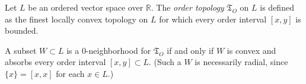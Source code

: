 Let $L$ be an ordered vector space over $\mathbb{R}$. The \textit{order topology} $\mathfrak{T}_O$ on $L$ is defined as the finest locally convex topology on $L$ for which every order interval $[x, y]$ is bounded.

A subset $W \subset L$ is a $0$-neighborhood for $\mathfrak{T}_O$ if and only if $W$ is convex and absorbs every order interval $[x, y] \subset L$. (Such a $W$ is necessarily radial, since $\{x\} = [x, x]$ for each $x \in L$.)
